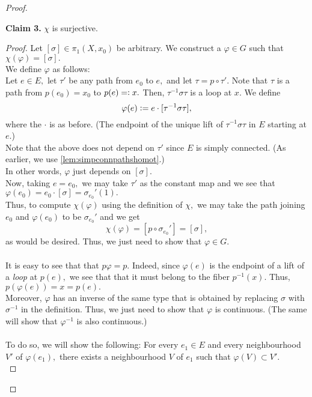 \documentclass[12pt]{article}
\theoremstyle{definition}
\numberwithin{thm}{section}
\newenvironment{blockquote}
{\begin{mdframed}[skipabove=0pt, skipbelow=0pt, innertopmargin=4pt, innerbottommargin=4pt, bottomline=false,topline=false,rightline=false, linewidth=2pt]}
{\end{mdframed}}
\begin{document}
\begin{proof}
	\begin{blockquote}
		\textbf{Claim 3.} $\chi$ is surjective.
		\begin{proof} 
			Let $[\sigma]\in\pi_1(X, x_0)$ be arbitrary. We construct a $\varphi \in G$ such that $\chi(\varphi) = [\sigma].$\\
			We define $\varphi$ as follows:\\
			Let $e \in E,$ let $\tau'$ be any path from $e_0$ to $e,$ and let $\tau = p\circ\tau'.$ Note that $\tau$ is a path from $p(e_0) = x_0$ to $p(e) =\vcentcolon x.$ Then, $\tau^{-1}\sigma\tau$ is a loop at $x.$ We define
			\begin{equation*} 
				\varphi(e) \vcentcolon= e\cdot[\tau^{-1}\sigma\tau],
			\end{equation*}
			where the $\cdot$ is as before. (The endpoint of the unique lift of $\tau^{-1}\sigma\tau$ in $E$ starting at $e.$)\\
			Note that the above does not depend on $\tau'$ since $E$ is simply connected. (As earlier, we use \cref{lem:simpconnpathshomot}.)\\
			In other words, $\varphi$ just depends on $[\sigma].$\\
			Now, taking $e = e_0,$ we may take $\tau'$ as the constant map and we see that $\varphi(e_0) = e_0\cdot[\sigma] = \sigma_{e_0}'(1).$\\
			Thus, to compute $\chi(\varphi)$ using the definition of $\chi,$ we may take the path joining $e_0$ and $\varphi(e_0)$ to be $\sigma_{e_0}'$ and we get
			\begin{equation*} 
				\chi(\varphi) = [p \circ \sigma_{e_0}'] = [\sigma],
			\end{equation*}
			as would be desired. Thus, we just need to show that $\varphi \in G.$\\~\\
			It is easy to see that that $p\varphi = p.$ Indeed, since $\varphi(e)$ is the endpoint of a lift of a \emph{loop} at $p(e),$ we see that that it must belong to the fiber $p^{-1}(x).$ Thus, $p(\varphi(e)) = x = p(e).$\\
			Moreover, $\varphi$ has an inverse of the same type that is obtained by replacing $\sigma$ with $\sigma^{-1}$ in the definition. Thus, we just need to show that $\varphi$ is continuous. (The same will show that $\varphi^{-1}$ is also continuous.)\\~\\
			To do so, we will show the following: For every $e_1 \in E$ and every neighbourhood $V'$ of $\varphi(e_1),$ there exists a neighbourhood $V$ of $e_1$ such that $\varphi(V) \subset V'.$\\

\end{proof}
\end{blockquote}
\end{proof}
\end{document}
